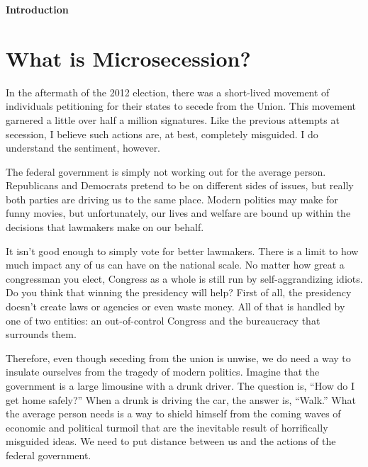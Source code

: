 
\clearpage\setcounter{page}{1}\pagestyle{Standard}
{\centering{}\bfseries\color{black}
Introduction
\par}


\bigskip

\section{What is Microsecession?}

\bigskip

{\color{black}
In the aftermath of the 2012 election, there was a short-lived movement
of individuals petitioning for their states to secede from the
Union. This movement
garnered a little over half a million signatures. Like the previous
attempts at secession, I believe such actions are, at best, completely
misguided. I do understand the
sentiment, however. }

{\color{black}
The federal government is simply not working out for the average person.
Republicans and Democrats pretend to be on different sides of issues,
but really both
parties are driving us to the same place. Modern politics
may make for funny
movies, but unfortunately, our lives and welfare are bound up within
the decisions that lawmakers make on our behalf.}

{\color{black}
It isn’t good enough to simply vote for better lawmakers. There is a
limit to how much impact any of us can have on the national scale. No
matter how great a congressman you elect, Congress as a whole is still
run by self-aggrandizing idiots. Do you think that winning the
presidency will help?  First of all, the presidency doesn’t create laws
or agencies or even waste money. All of that is handled by one of two
entities: an out-of-control Congress and the bureaucracy that surrounds
them.}

{\color{black}
Therefore, even though seceding from the union is unwise, we do need a
way to insulate ourselves from the tragedy of modern politics. Imagine
that the government is a large limousine with a drunk driver. The
question is, “How do I get home safely?”  When a drunk is driving the
car, the answer is, “Walk.”  What the average person needs is a way to
shield himself from the coming waves of economic and political turmoil
that are the inevitable result of horrifically misguided ideas. We need
to put distance between us and the actions of the federal government. }

